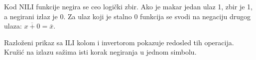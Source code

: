
Kod NILI funkcije negira se ceo logički zbir. Ako je makar jedan ulaz 1, zbir je 1, a negirani izlaz je 0. Za ulaz koji je stalno 0 funkcija se svodi na negaciju drugog ulaza: \(\overline{x+0}=\bar{x}\).

Razloženi prikaz sa ILI kolom i invertorom pokazuje redosled tih operacija. Kružić na izlazu sažima isti korak negiranja u jednom simbolu.
